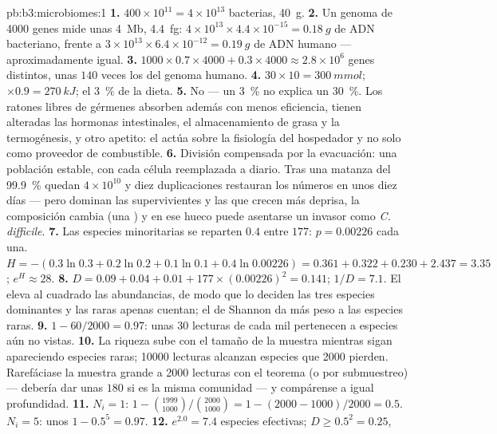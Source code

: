 \begin{solution}{pb:b3:microbiomes:1}
\textbf{1.} $400\times 10^{11} = 4\times 10^{13}$ bacterias, \qty{40}{g}.
\textbf{2.} Un genoma de \num{4000} genes mide unas \qty{4}{Mb},
\qty{4.4}{fg}: $4\times 10^{13}\times 4.4\times 10^{-15} = \qty{0.18}{g}$
de ADN bacteriano, frente a
$3\times 10^{13}\times 6.4\times 10^{-12} = \qty{0.19}{g}$ de ADN humano
--- aproximadamente igual.
\textbf{3.} $1000\times 0.7\times 4000 + 0.3\times 4000 \approx 2.8\times
10^{6}$ genes distintos, unas $140$ veces los del genoma humano.
\textbf{4.} $30\times 10 = \qty{300}{mmol}$; $\times 0.9 = \qty{270}{kJ}$;
el \qty{3}{\%} de la dieta.
\textbf{5.} No --- un \qty{3}{\%} no explica un \qty{30}{\%}. Los ratones
libres de gérmenes absorben además con menos eficiencia, tienen alteradas
las hormonas intestinales, el almacenamiento de grasa y la termogénesis,
y otro apetito: el  actúa sobre la fisiología del hospedador y
no solo como proveedor de combustible.
\textbf{6.} División compensada por la evacuación: una población estable,
con cada célula reemplazada a diario. Tras una matanza del \qty{99.9}{\%}
quedan $4\times 10^{10}$ y diez duplicaciones restauran los números en
unos diez días --- pero dominan las supervivientes y las que crecen más
deprisa, la composición cambia (una ) y en ese hueco puede
asentarse un invasor como \emph{C. difficile}.
\textbf{7.} Las especies minoritarias se reparten $0.4$ entre $177$:
$p = 0.00226$ cada una. $H
= -(0.3\ln 0.3 + 0.2\ln 0.2 + 0.1\ln 0.1 + 0.4\ln 0.00226) = 0.361 +
0.322 + 0.230 + 2.437 = 3.35$; $e^{H} \approx 28$.
\textbf{8.} $D = 0.09 + 0.04 + 0.01 + 177\times (0.00226)^{2} = 0.141$;
$1/D = 7.1$. El  eleva al cuadrado las abundancias, de
modo que lo deciden las tres especies dominantes y las raras apenas
cuentan; el de Shannon da más peso a las especies raras.
\textbf{9.} $1 - 60/2000 = 0.97$: unas $30$ lecturas de cada mil
pertenecen a especies aún no vistas.
\textbf{10.} La riqueza sube con el tamaño de la muestra mientras sigan
apareciendo especies raras; \num{10000} lecturas alcanzan especies que
\num{2000} pierden. Rarefáciase la muestra grande a \num{2000} lecturas
con el teorema (o por submuestreo) --- debería dar unas $180$ si es la
misma comunidad --- y compárense a igual profundidad.
\textbf{11.} $N_{i} = 1$: $1 - \binom{1999}{1000}/\binom{2000}{1000} =
1 - (2000 - 1000)/2000 = 0.5$. $N_{i} = 5$: unos $1 - 0.5^{5} = 0.97$.
\textbf{12.} $e^{2.0} = 7.4$ especies efectivas; $D \ge 0.5^{2} = 0.25$,

\end{solution}
